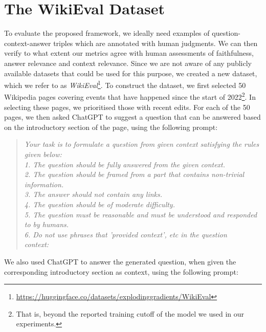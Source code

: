 \documentclass[11pt]{article}
\begin{document}



\section{The WikiEval Dataset}
To evaluate the proposed framework, we ideally need examples of question-context-answer triples which are annotated with human judgments. We can then verify to what extent our metrics agree with human assessments of faithfulness, answer relevance and context relevance. Since we are not aware of any publicly available datasets that could be used for this purpose, we created a new dataset, which we refer to as \textit{WikiEval}\footnote{\url{https://huggingface.co/datasets/explodinggradients/WikiEval}}. To construct the dataset, we first selected 50 Wikipedia pages covering events that have happened since the start of 2022\footnote{That is, beyond the reported training cutoff of the model we used in our experiments.}. In selecting these pages, we prioritised those with recent edits. For each of the 50 pages, we then asked ChatGPT to suggest a question that can be answered based on the introductory section of the page, using the following prompt:
\begin{quote}
\textit{Your task is to formulate a question from given context satisfying the rules given below:\\
    1. The question should be fully answered from the given context. \\
    2. The question should be framed from a part that contains non-trivial information.\\ 
    3. The answer should not contain any links.\\ 
    4. The question should be of moderate difficulty.\\
    5. The question must be reasonable and must be understood and responded to by humans.\\
    6. Do not use phrases that 'provided context', etc in the question\\
    context:}
\end{quote}
We also used ChatGPT to answer the generated question, when given the corresponding introductory section as context, using the following prompt:
\end{document}
